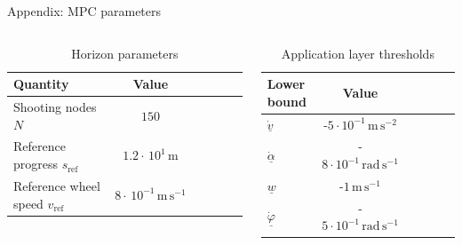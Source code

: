 \documentclass[10pt,aspectratio=1610]{beamer} %
\begin{document}
\begin{frame}{Appendix: MPC parameters}
	\begin{columns}[onlytextwidth]
		\begin{column}{0.5\textwidth}	
		\begin{table}[h!tbp]
			\small
			\begin{center}
				\begin{tabular}{lccccl}\toprule
					\textbf{Quantity} & \textbf{Value}\\
					\midrule
					Shooting nodes $N$ & $150$ \\
					Reference progress $s_{\mathrm{ref}}$ & $1.2\cdot\,10^{1}\,\mathrm{m}$ \\
					Reference wheel speed $v_{\mathrm{ref}}$ & $8\cdot\,10^{-1}\,\mathrm{m\,s^{-1}}$\\
					\bottomrule
				\end{tabular}
			\end{center}
			\caption{Horizon parameters}
		\end{table}
		\end{column}
		\begin{column}{0.5\textwidth}	
			\begin{table}[h!tbp]
				\small
				\begin{center}
					\begin{tabular}{lccccl}\toprule
						\textbf{Lower bound} & \textbf{Value}\\
						\midrule
						$\underline{\dot{v}}$& -$5\cdot10^{-1}\,\mathrm{m\,s^{-2}}$ \\
						$\underline{\dot{\alpha}}$& -$8\cdot10^{-1}\,\mathrm{rad\,s^{-1}}$ \\
						$\underline{w}$ & -$1\,\mathrm{m\,s^{-1}}$ \\
						$\underline{\dot{\varphi}}$& -$5\cdot10^{-1}\,\mathrm{rad\,s^{-1}}$ \\
						\bottomrule
					\end{tabular}
				\end{center}
				\caption{Application layer thresholds}
			\end{table}
			\end{column}
	\end{columns}
\end{frame}		
\end{document}
